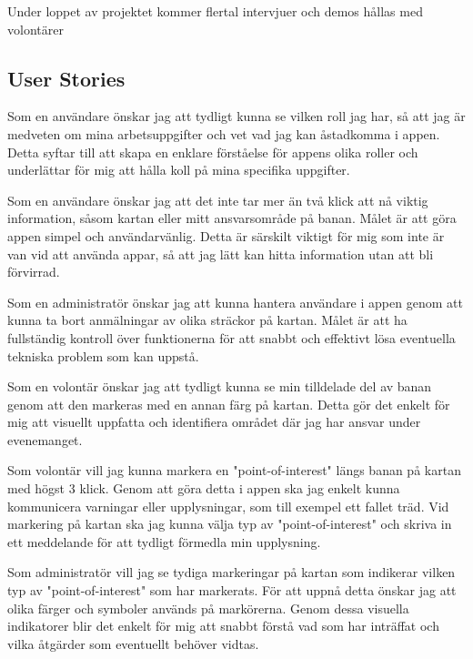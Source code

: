 Under loppet av projektet kommer flertal intervjuer och demos hållas med volontärer

\subsection{User Stories}


Som en användare önskar jag att tydligt kunna se vilken roll jag har, så att jag är medveten om mina arbetsuppgifter och vet vad jag kan åstadkomma i appen. Detta syftar till att skapa en enklare förståelse för appens olika roller och underlättar för mig att hålla koll på mina specifika uppgifter.

\vspace{1em}
Som en användare önskar jag att det inte tar mer än två klick att nå viktig information, såsom kartan eller mitt ansvarsområde på banan. Målet är att göra appen simpel och användarvänlig. Detta är särskilt viktigt för mig som inte är van vid att använda appar, så att jag lätt kan hitta information utan att bli förvirrad.

\vspace{1em}
Som en administratör önskar jag att kunna hantera användare i appen genom att kunna ta bort anmälningar av olika sträckor på kartan. Målet är att ha fullständig kontroll över funktionerna för att snabbt och effektivt lösa eventuella tekniska problem som kan uppstå.

\vspace{1em}
Som en volontär önskar jag att tydligt kunna se min tilldelade del av banan genom att den markeras med en annan färg på kartan. Detta gör det enkelt för mig att visuellt uppfatta och identifiera området där jag har ansvar under evenemanget.

\vspace{1em}

Som volontär vill jag kunna markera en "point-of-interest" längs banan på kartan med högst 3 klick. Genom att göra detta i appen ska jag enkelt kunna kommunicera varningar eller upplysningar, som till exempel ett fallet träd. Vid markering på kartan ska jag kunna välja typ av "point-of-interest" och skriva in ett meddelande för att tydligt förmedla min upplysning.
\vspace{1em}

Som administratör vill jag se tydiga markeringar på kartan som indikerar vilken typ av "point-of-interest" som har markerats. För att uppnå detta önskar jag att olika färger och symboler används på markörerna. Genom dessa visuella indikatorer blir det enkelt för mig att snabbt förstå vad som har inträffat och vilka åtgärder som eventuellt behöver vidtas.

